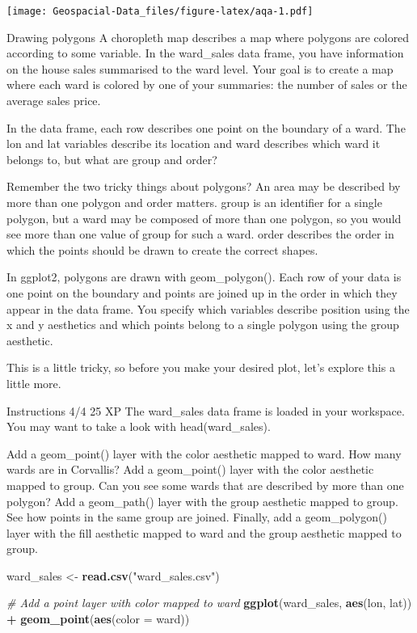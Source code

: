 \documentclass[]{article}
\newenvironment{Shaded}{\begin{snugshade}}{\end{snugshade}}
\newcommand{\CommentTok}[1]{\textcolor[rgb]{0.56,0.35,0.01}{\textit{#1}}}
\newcommand{\DataTypeTok}[1]{\textcolor[rgb]{0.13,0.29,0.53}{#1}}
\newcommand{\KeywordTok}[1]{\textcolor[rgb]{0.13,0.29,0.53}{\textbf{#1}}}
\newcommand{\NormalTok}[1]{#1}
\newcommand{\OperatorTok}[1]{\textcolor[rgb]{0.81,0.36,0.00}{\textbf{#1}}}
\newcommand{\StringTok}[1]{\textcolor[rgb]{0.31,0.60,0.02}{#1}}
\begin{document}
\texttt{[image: Geospacial-Data\_files/figure-latex/aqa-1.pdf]}

Drawing polygons A choropleth map describes a map where polygons are
colored according to some variable. In the ward\_sales data frame, you
have information on the house sales summarised to the ward level. Your
goal is to create a map where each ward is colored by one of your
summaries: the number of sales or the average sales price.

In the data frame, each row describes one point on the boundary of a
ward. The lon and lat variables describe its location and ward describes
which ward it belongs to, but what are group and order?

Remember the two tricky things about polygons? An area may be described
by more than one polygon and order matters. group is an identifier for a
single polygon, but a ward may be composed of more than one polygon, so
you would see more than one value of group for such a ward. order
describes the order in which the points should be drawn to create the
correct shapes.

In ggplot2, polygons are drawn with geom\_polygon(). Each row of your
data is one point on the boundary and points are joined up in the order
in which they appear in the data frame. You specify which variables
describe position using the x and y aesthetics and which points belong
to a single polygon using the group aesthetic.

This is a little tricky, so before you make your desired plot, let's
explore this a little more.

Instructions 4/4 25 XP The ward\_sales data frame is loaded in your
workspace. You may want to take a look with head(ward\_sales).

Add a geom\_point() layer with the color aesthetic mapped to ward. How
many wards are in Corvallis? Add a geom\_point() layer with the color
aesthetic mapped to group. Can you see some wards that are described by
more than one polygon? Add a geom\_path() layer with the group aesthetic
mapped to group. See how points in the same group are joined. Finally,
add a geom\_polygon() layer with the fill aesthetic mapped to ward and
the group aesthetic mapped to group.

\begin{Shaded}
\begin{Highlighting}[]
\NormalTok{ward_sales <-}\StringTok{ }\KeywordTok{read.csv}\NormalTok{(}\StringTok{"ward_sales.csv"}\NormalTok{)}

\CommentTok{# Add a point layer with color mapped to ward}
\KeywordTok{ggplot}\NormalTok{(ward_sales, }\KeywordTok{aes}\NormalTok{(lon, lat)) }\OperatorTok{+}
\KeywordTok{geom_point}\NormalTok{(}\KeywordTok{aes}\NormalTok{(}\DataTypeTok{color =}\NormalTok{ ward))}
\end{Highlighting}
\end{Shaded}
\end{document}
